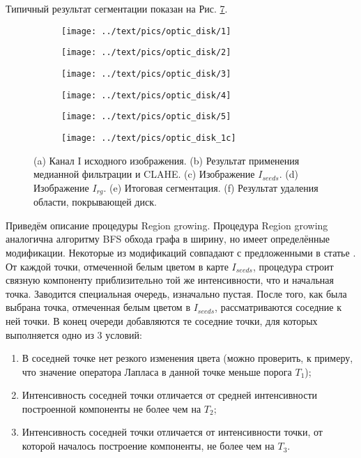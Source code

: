 \documentclass[12pt,fleqn]{article}
\begin{document}
Типичный результат сегментации показан на Рис. \ref{fig:optic_disk_1}.

\begin{figure}[h]
	\begin{subfigure}{0.31\textwidth}
		\centering
		\texttt{[image: ../text/pics/optic\_disk/1]}
		\caption{}
		\label{fig:od1}
	\end{subfigure}
	\hfill
	\begin{subfigure}{0.31\textwidth}
		\centering
		\texttt{[image: ../text/pics/optic\_disk/2]}
		\caption{}
		\label{fig:od2}
	\end{subfigure}
	\hfill
	\begin{subfigure}{0.31\textwidth}
		\centering
		\texttt{[image: ../text/pics/optic\_disk/3]}
		\caption{}
		\label{fig:od3}
	\end{subfigure}
	\hfill
	\begin{subfigure}{0.31\textwidth}
		\centering
		\texttt{[image: ../text/pics/optic\_disk/4]}
		\caption{}
		\label{fig:od4}
	\end{subfigure}
	\hfill
	\begin{subfigure}{0.31\textwidth}
		\centering
		\texttt{[image: ../text/pics/optic\_disk/5]}
		\caption{}
		\label{fig:od5}
	\end{subfigure}
	\hfill
	\begin{subfigure}{0.31\textwidth}
		\centering
		\texttt{[image: ../text/pics/optic\_disk\_1c]}
		\caption{}
		\label{fig:od6}
	\end{subfigure}
	\caption{(a) Канал I исходного изображения. (b) Результат применения медианной фильтрации и CLAHE. (c) Изображение $I_{seeds}$. (d) Изображение $I_{rg}$. (e) Итоговая сегментация. (f) Результат удаления области, покрывающей диск.}
	\label{fig:optic_disk_1}
\end{figure}

Приведём описание процедуры Region growing. Процедура Region growing аналогична алгоритму BFS обхода графа в ширину, но имеет определённые модификации.  Некоторые из модификаций совпадают с предложенными в статье \cite{huiqi_li}. От каждой точки, отмеченной белым цветом в карте $I_{seeds}$, процедура строит связную компоненту приблизительно той же интенсивности, что и начальная точка. Заводится специальная очередь, изначально пустая. После того, как была выбрана точка, отмеченная белым цветом в $I_{seeds}$, рассматриваются соседние к ней точки. В конец очереди добавляются те соседние точки, для которых выполняется одно из 3 условий:
\begin{enumerate}
	\item В соседней точке нет резкого изменения цвета (можно проверить, к примеру, что значение оператора Лапласа в данной точке меньше порога $T_1$);
	\item Интенсивность соседней точки отличается от средней интенсивности построенной компоненты не более чем на $T_2$;
	\item Интенсивность соседней точки отличается от интенсивности точки, от которой началось построение компоненты, не более чем на $T_3$.
\end{enumerate}
\end{document}
